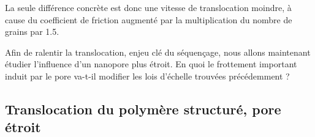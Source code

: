 La seule différence concrète est donc une vitesse de translocation moindre, à cause du coefficient de friction augmenté par la multiplication du nombre de grains par 1.5.


Afin de ralentir la translocation, enjeu clé du séquençage, nous allons maintenant étudier l'influence d'un nanopore plus étroit. En quoi le frottement important induit par le pore va-t-il modifier les lois d'échelle trouvées précédemment ?






%



\subsection{Translocation du polymère structuré, pore étroit}


